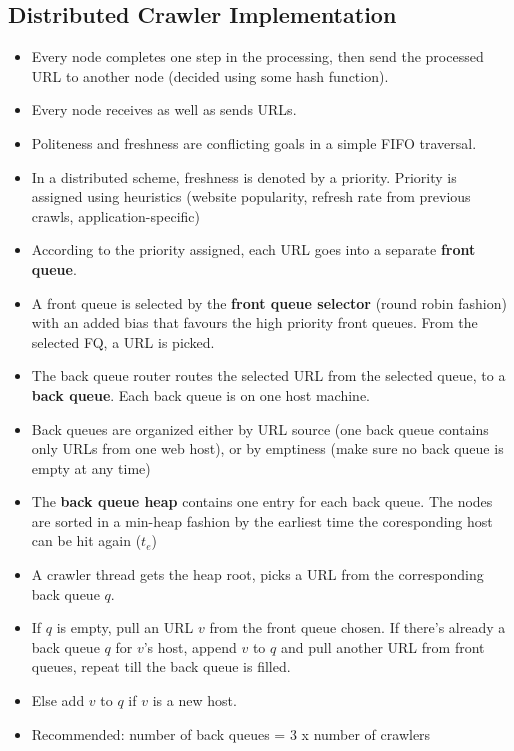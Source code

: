 \documentclass{article}
\begin{document}
\subsection{Distributed Crawler Implementation}
\begin{itemize}
    \item Every node completes one step in the processing, then send the processed URL to another node (decided using some hash function).
    
    \item Every node receives as well as sends URLs.
    
    \item Politeness and freshness are conflicting goals in a simple FIFO traversal.
    
    \item In a distributed scheme, freshness is denoted by a priority. Priority is assigned using heuristics (website popularity, refresh rate from previous crawls, application-specific)
    
    \item According to the priority assigned, each URL goes into a separate \textbf{front queue}. 
    
    \item A front queue is selected by the \textbf{front queue selector} (round robin fashion) with an added bias that favours the high priority front queues. From the selected FQ, a URL is picked.
    
    \item The back queue router routes the selected URL from the selected queue, to a \textbf{back queue}. Each back queue is on one host machine.
    
    \item Back queues are organized either by URL source (one back queue contains only URLs from one web host), or by emptiness (make sure no back queue is empty at any time)
    
    \item The \textbf{back queue heap} contains one entry for each back queue. The nodes are sorted in a min-heap fashion by the earliest time the coresponding host can be hit again ($t_e$)
    
    \item A crawler thread gets the heap root, picks a URL from the corresponding back queue $q$.
    
    \item If $q$ is empty, pull an URL $v$ from the front queue chosen. If there’s already a back queue $q$ for $v$’s host, append $v$ to $q$ and pull another URL from front queues, repeat till the back queue is filled.
    
    \item Else add $v$ to $q$ if $v$ is a new host. 
    
    \item Recommended: number of back queues = 3 x number of crawlers
\end{itemize}
\end{document}
